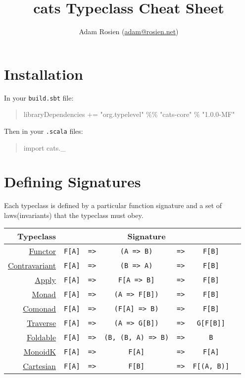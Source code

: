 \documentclass{tufte-handout}
\title{cats Typeclass Cheat Sheet}
\author[Adam Rosien]{Adam Rosien (\href{mailto:adam@rosien.net}{adam@rosien.net})}
\newcommand{\fa}{F[A]}
\newcommand{\fb}{F[B]}
\newcommand{\rarr}{\texttt{=>}}
\newcommand{\fThree}[3]{\texttt{#1} & \rarr & \texttt{#2} & \rarr & \texttt{#3}}
\newcommand{\sdocUrl}[1]{https://typelevel.org/cats/api/cats/#1.html}
\newcommand{\sdocHref}[1]{\href{\sdocUrl{#1}}{#1}}
\begin{document}
\maketitle%

\section{Installation}\label{sec:installation}

\noindent In your \texttt{build.sbt} file:

\begin{quote}
  \ttfamily libraryDependencies += "org.typelevel" \%\% "cats-core" \% "1.0.0-MF"
\end{quote}

\noindent Then in your \texttt{.scala} files:

\begin{quote}
  \ttfamily import cats.\_
\end{quote}

\section{Defining Signatures}

Each typeclass is defined by a particular function signature and a set of laws\footnotemark (invariants) that the typeclass must obey.


\begin{table}[ht]
  \centering
  \selectfont
  \setlength{\tabcolsep}{5pt}
  \begin{tabular}{rcrcccl}
    Typeclass & \multicolumn{5}{c}{Signature} \\
    \midrule
    \sdocHref{Functor}               & \fThree{\fa}{(A => B)}{\fb} \\
    \sdocHref{Contravariant}         & \fThree{\fa}{(B => A)}{\fb} \\
    \sdocHref{Apply}\footnotemark    & \fThree{\fa}{F[A => B]}{\fb} \\
    \sdocHref{Monad}                  & \fThree{\fa}{(A => F[B])}{\fb} \\
    \sdocHref{Comonad}                & \fThree{\fa}{(F[A] => B)}{\fb} \\
    \sdocHref{Traverse}\footnotemark & \fThree{\fa}{(A => G[B])}{G[F[B]]} \\
    \sdocHref{Foldable} & \fThree{\fa}{(B, (B, A) => B)}{B} \\
    \sdocHref{MonoidK}                  & \fThree{\fa}{\fa}{\fa} \\
    \sdocHref{Cartesian}                   & \fThree{\fa}{\fb}{F[(A, B)]} \\
  \end{tabular}
  \label{tab:normaltab}
\end{table}
\end{document}
